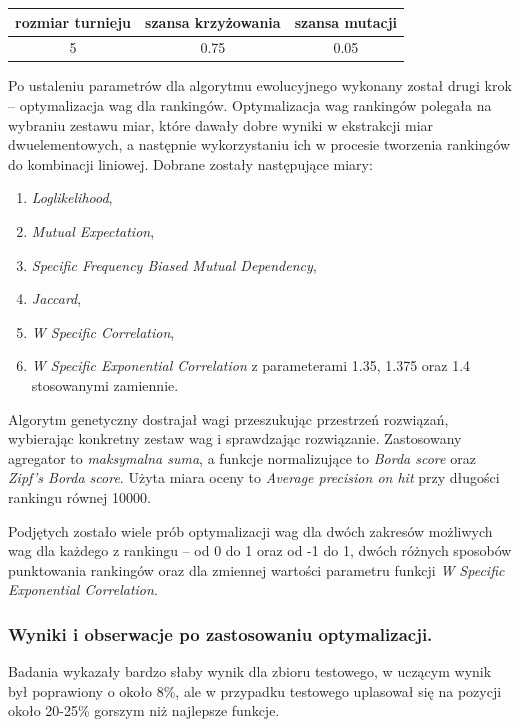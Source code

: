 \documentclass[11pt,a4paper]{llncs}
\begin{document}
\begin{table}[h!]
\centering
\begin{tabular}{ c | c | c }
	\toprule
	rozmiar turnieju & szansa krzyżowania & szansa mutacji \\
	\midrule
	5 & 0.75 & 0.05\\ 
	\bottomrule
\end{tabular}
\end{table}




Po ustaleniu parametrów dla algorytmu ewolucyjnego wykonany został drugi krok -- optymalizacja wag dla rankingów.
Optymalizacja wag rankingów polegała na wybraniu zestawu miar, które dawały dobre wyniki w ekstrakcji miar dwuelementowych, a następnie wykorzystaniu ich w procesie tworzenia rankingów do kombinacji liniowej.
Dobrane zostały następujące miary:
\begin{enumerate}
	\item \emph{Loglikelihood},
	\item \emph{Mutual Expectation},
	\item \emph{Specific Frequency Biased Mutual Dependency},
	\item \emph{Jaccard},
	\item \emph{W Specific Correlation},
	\item \emph{W Specific Exponential Correlation} z parameterami 1.35, 1.375 oraz 1.4 stosowanymi zamiennie.
\end{enumerate}


Algorytm genetyczny dostrajał wagi przeszukując przestrzeń rozwiązań, wybierając konkretny zestaw wag i sprawdzając rozwiązanie.
Zastosowany agregator to \emph{maksymalna suma}, a funkcje normalizujące to \emph{Borda score} oraz \emph{Zipf's Borda score}.
Użyta miara oceny to \emph{Average precision on hit} przy długości rankingu równej 10000.


Podjętych zostało wiele prób optymalizacji wag dla dwóch zakresów możliwych wag dla każdego z rankingu -- od 0 do 1 oraz od -1 do 1, dwóch różnych sposobów punktowania rankingów oraz dla zmiennej wartości parametru funkcji \emph{W Specific Exponential Correlation}.


\subsubsection{Wyniki i obserwacje po zastosowaniu optymalizacji. }

Badania wykazały bardzo słaby wynik dla zbioru testowego, w uczącym wynik był poprawiony o około 8\%, ale w przypadku testowego uplasował się na pozycji około 20-25\% gorszym niż najlepsze funkcje.
\end{document}
